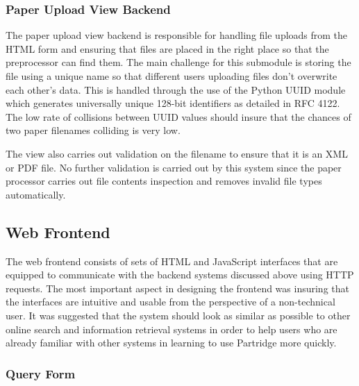 \subsubsection{Paper Upload View Backend}

The paper upload view backend is responsible for handling file uploads from the
HTML form and ensuring that files are placed in the right place so that the
preprocessor can find them. The main challenge for this submodule is storing
the file using a unique name so that different users uploading files don't
overwrite each other's data. This is handled through the use of the Python UUID
module which generates universally unique 128-bit identifiers as detailed in RFC
4122\cite{rfc4122}. The low rate of collisions between UUID values should
insure that the chances of two paper filenames colliding is very low. 

The view also carries out validation on the filename to ensure that it is an
XML or PDF file. No further validation is carried out by this system since the
paper processor carries out file contents inspection and removes invalid file
types automatically.


\subsection{ Web Frontend }
\label{sec:web_frontend}

The web frontend consists of sets of HTML and JavaScript interfaces that are
equipped to communicate with the backend systems discussed above using HTTP
requests. The most important aspect in designing the frontend was insuring that
the interfaces are intuitive and usable from the perspective of a non-technical
user. It was suggested that the system should look as similar as possible to
other online search and information retrieval systems in order to help users
who are already familiar with other systems in learning to use Partridge more
quickly.

\subsubsection{ Query Form }

